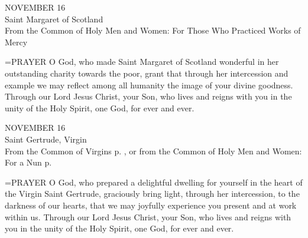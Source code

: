 \begin{center}\normalsize NOVEMBER 16\\
\footnotesize Saint Margaret of Scotland\\
\footnotesize From the Common of Holy Men and Women: For Those Who Practiced Works of Mercy\\
\end{center}

\hangindent=\parindent \small{PRAYER 
O God, who made Saint Margaret of Scotland wonderful
in her outstanding charity towards the poor,
grant that through her intercession and example
we may reflect among all humanity
the image of your divine goodness.
Through our Lord Jesus Christ, your Son,
who lives and reigns with you in the unity of the Holy Spirit,
one God, for ever and ever.\\}
 
\begin{center}\normalsize NOVEMBER 16\\
\footnotesize Saint Gertrude, Virgin\\
\footnotesize From the Common of Virgins p.   , or from the Common of Holy Men and Women:\\
\footnotesize For a Nun p. \\
\end{center}

\hangindent=\parindent \small{PRAYER 
O God, who prepared a delightful dwelling for yourself
in the heart of the Virgin Saint Gertrude,
graciously bring light, through her intercession,
to the darkness of our hearts,
that we may joyfully experience you present and at work within us.
Through our Lord Jesus Christ, your Son,
who lives and reigns with you in the unity of the Holy Spirit,
one God, for ever and ever.\\}
 
